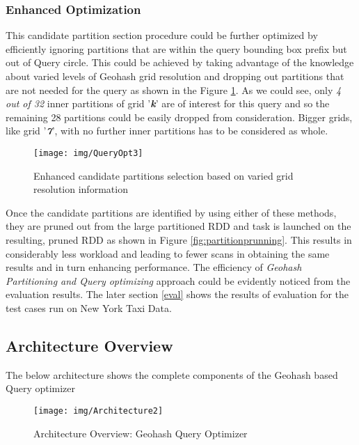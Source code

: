 \documentclass[article,type=msc,colorback,12pt,accentcolor=tud1d]{tudthesis}
\begin{document}
			\subsubsection{Enhanced Optimization}
				\par This candidate partition section procedure could be further optimized by efficiently ignoring partitions that are within the query bounding box prefix but out of Query circle. This could be achieved by taking advantage of the knowledge about varied levels of Geohash grid resolution and dropping out partitions that are not needed for the query as shown in the Figure \ref{fig:QueryOpt3}. As we could see, only \textit{4 out of 32} inner partitions of grid '\textit{\textbf{k}}' are of interest for this query and so the remaining 28 partitions could be easily dropped from consideration. Bigger grids, like grid '\textit{\textbf{7}}', with no further inner partitions has to be considered as whole.
				
				
					\begin{figure}[h]
					\centering
					\texttt{[image: img/QueryOpt3]}
					\caption{Enhanced candidate partitions selection based on varied grid resolution information}
					\label{fig:QueryOpt3}
					\end{figure}
			
			Once the candidate partitions are identified by using either of these methods, they are pruned out from the large partitioned RDD and task is launched on the resulting, pruned RDD as shown in Figure \ref{fig:partitionprunning}. This results in considerably less workload and leading to fewer scans in obtaining the same results and in turn enhancing performance. The efficiency of \textit{Geohash Partitioning and Query optimizing} approach could be evidently noticed from the evaluation results. The later section \ref{eval} shows the results of evaluation for the test cases run on New York Taxi Data.
			
		 
		\clearpage
		
		\subsection{Architecture Overview}
			The below architecture shows the complete components of the Geohash based Query optimizer 
			\begin{figure}[h]
				\centering
				\texttt{[image: img/Architecture2]}
				\caption{Architecture Overview: Geohash Query Optimizer}
				\label{fig:Architecture2}
			\end{figure}
		
\end{document}
